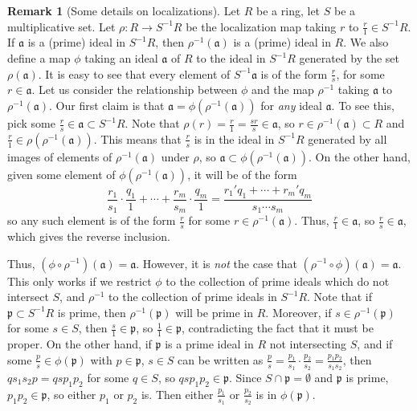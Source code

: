 \documentclass[aps,pra,showpacs,notitlepage,onecolumn,superscriptaddress,nofootinbib]{revtex4-1}
\theoremstyle{definition}
\newtheorem{remark}{Remark}[section]
\begin{document}
\begin{remark}[Some details on localizations]
  \label{rem:s0}
  Let $R$ be a ring, let $S$ be a multiplicative set. Let $\rho : R \rightarrow S^{-1} R$ be the localization map taking $r$ to $\frac{r}{1} \in S^{-1} R$. If $\mathfrak{a}$ is a (prime) ideal in $S^{-1} R$, then
  $\rho^{-1}(\mathfrak{a})$ is a (prime) ideal in $R$. We also define a map $\phi$ taking an ideal $\mathfrak{a}$ of $R$ to the ideal in $S^{-1} R$ generated by the set $\rho(\mathfrak{a})$.
  It is easy to see that every element of $S^{-1} \mathfrak{a}$ is of the form $\frac{r}{s}$, for some $r \in \mathfrak{a}$. Let us consider the relationship
  between $\phi$ and the map $\rho^{-1}$ taking $\mathfrak{a}$ to $\rho^{-1}(\mathfrak{a})$. Our first claim is that $\mathfrak{a} = \phi(\rho^{-1}(\mathfrak{a}))$ for \emph{any} ideal $\mathfrak{a}$. To see this,
  pick some $\frac{r}{s} \in \mathfrak{a} \subset S^{-1} R$. Note that $\rho(r) = \frac{r}{1} = \frac{s r}{s} \in \mathfrak{a}$, so $r \in \rho^{-1}(\mathfrak{a}) \subset R$ and $\frac{r}{1} \in \rho(\rho^{-1}(\mathfrak{a}))$.
  This means that $\frac{r}{s}$ is
  in the ideal in $S^{-1} R$ generated by all images of elements of $\rho^{-1}(\mathfrak{a})$ under $\rho$, so $\mathfrak{a} \subset \phi(\rho^{-1}(\mathfrak{a}))$. On the other hand, given some element of $\phi(\rho^{-1}(\mathfrak{a}))$,
  it will be of the form
  \begin{equation}
    \frac{r_1}{s_1} \cdot \frac{q_1}{1} + \cdots + \frac{r_m}{s_m} \cdot \frac{q_m}{1} = \frac{r_1' q_1 + \cdots + r_m' q_m}{s_1 \cdots s_m}
    \end{equation}
  so any such element is of the form $\frac{r}{s}$ for some $r \in \rho^{-1}(\mathfrak{a})$. Thus, $\frac{r}{1} \in \mathfrak{a}$, so $\frac{r}{s} \in \mathfrak{a}$, which gives the reverse inclusion.

  Thus, $(\phi \circ \rho^{-1})(\mathfrak{a}) = \mathfrak{a}$. However, it is \emph{not} the case that $(\rho^{-1} \circ \phi)(\mathfrak{a}) = \mathfrak{a}$. This only works if we restrict $\phi$ to the collection
  of prime ideals which do not intersect $S$, and $\rho^{-1}$ to the collection of prime ideals in $S^{-1} R$. Note that if $\mathfrak{p} \subset S^{-1} R$ is prime, then $\rho^{-1}(\mathfrak{p})$ will be prime
  in $R$. Moreover, if $s \in \rho^{-1}(\mathfrak{p})$ for some $s \in S$, then $\frac{s}{1} \in \mathfrak{p}$, so $\frac{1}{1} \in \mathfrak{p}$, contradicting the fact that it must be proper. On the other hand,
  if $\mathfrak{p}$ is a prime ideal in $R$ not intersecting $S$, and if some $\frac{p}{s} \in \phi(\mathfrak{p})$ with $p \in \mathfrak{p}$, $s \in S$
  can be written as $\frac{p}{s} = \frac{p_1}{s_1} \cdot \frac{p_2}{s_2} = \frac{p_1 p_2}{s_1 s_2}$, then $q s_1 s_2 p =  qs p_1 p_2$ for some $q \in S$, so $qs p_1 p_2 \in \mathfrak{p}$. Since $S \cap \mathfrak{p} = \emptyset$
  and $\mathfrak{p}$ is prime, $p_1 p_2 \in \mathfrak{p}$, so either $p_1$ or $p_2$ is. Then either $\frac{p_1}{s_1}$ or $\frac{p_2}{s_2}$ is in $\phi(\mathfrak{p})$.


\end{remark}
\end{document}
